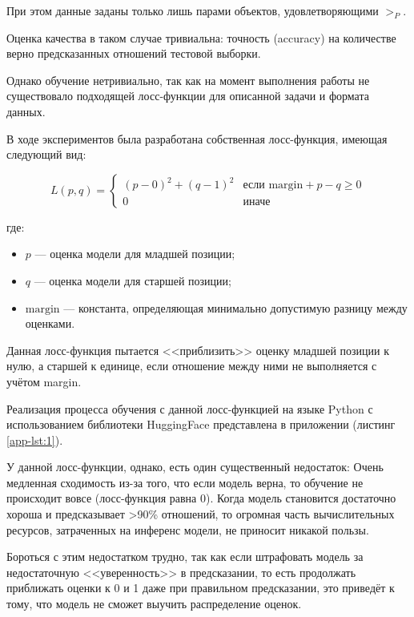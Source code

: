 \documentclass[14pt]{mmcs_article}
\begin{document}
  При этом данные заданы только лишь парами объектов, удовлетворяющими $>_{P}$.

Оценка качества в таком случае тривиальна: точность (accuracy) на количестве верно предсказанных отношений тестовой выборки.

Однако обучение нетривиально, так как на момент выполнения работы не существовало подходящей лосс-функции для описанной задачи и формата данных.

В ходе экспериментов была разработана собственная лосс-функция, имеющая следующий вид:

\begin{equation}
  \label{eq:custom_loss_function}
  L(p, q) = \begin{cases}
    (p - 0)^2 + (q - 1)^2 & \text{если } \text{margin} + p - q \geq 0 \\
    0                     & \text{иначе}
  \end{cases}
\end{equation}

где:
\begin{itemize}
  \item $p$ --- оценка модели для младшей позиции;
  \item $q$ --- оценка модели для старшей позиции;
  \item $\text{margin}$ --- константа, определяющая минимально допустимую разницу между оценками.
\end{itemize}

Данная лосс-функция пытается <<приблизить>> оценку младшей позиции к нулю, а старшей к единице, если отношение между ними не выполняется с учётом margin.

Реализация процесса обучения с данной лосс-функцией на языке Python с использованием библиотеки HuggingFace \cite{wolf2020huggingfacestransformersstateoftheartnatural} представлена в приложении (листинг \ref{app-lst:1}).

У данной лосс-функции, однако, есть один существенный недостаток: Очень медленная сходимость из-за того, что если модель верна, то обучение не происходит вовсе (лосс-функция равна 0). Когда модель становится достаточно хороша и предсказывает >90\% отношений, то огромная часть вычислительных ресурсов, затраченных на инференс модели, не приносит никакой пользы.

Бороться с этим недостатком трудно, так как если штрафовать модель за недостаточную <<уверенность>> в предсказании, то есть продолжать приближать оценки к 0 и 1 даже при правильном предсказании, это приведёт к тому, что модель не сможет выучить распределение оценок.
\end{document}
